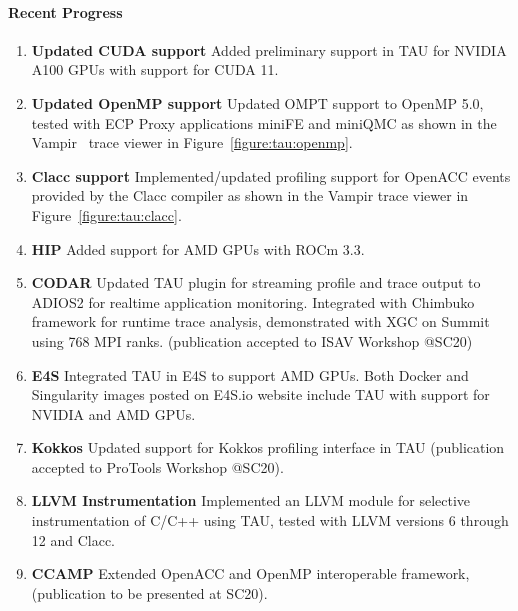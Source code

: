 \paragraph{Recent Progress}
\begin{enumerate}
\item \textbf{Updated CUDA support} Added preliminary support in TAU for NVIDIA A100 GPUs with support for CUDA 11.

\item \textbf{Updated OpenMP support} Updated OMPT support to OpenMP 5.0, tested with ECP Proxy applications miniFE and miniQMC as shown in the Vampir~\cite{vampir.eu} trace viewer in Figure~\ref{figure:tau:openmp}.

\item \textbf{Clacc support} Implemented/updated profiling support for OpenACC events provided by the Clacc compiler as shown in the Vampir trace viewer in Figure~\ref{figure:tau:clacc}.

\item \textbf{HIP} Added support for AMD GPUs with ROCm 3.3.

\item \textbf{CODAR} Updated TAU plugin for streaming profile and trace output to ADIOS2 for realtime application monitoring.  Integrated with Chimbuko framework for runtime trace analysis, demonstrated with XGC on Summit using 768 MPI ranks. (publication accepted to ISAV Workshop @SC20)

\item \textbf{E4S} Integrated TAU in E4S to support AMD GPUs. Both Docker and Singularity images posted on E4S.io website include TAU with support for NVIDIA and AMD GPUs.

\item \textbf{Kokkos} Updated support for Kokkos profiling interface in TAU (publication accepted to ProTools Workshop @SC20).

\item \textbf{LLVM Instrumentation} Implemented an LLVM module for selective instrumentation of C/C++ using TAU, tested with LLVM versions 6 through 12 and Clacc.

\item \textbf{CCAMP} Extended OpenACC and OpenMP interoperable framework, (publication to be presented at SC20).
\end{enumerate}

